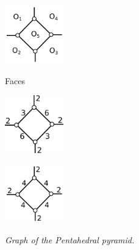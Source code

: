 \documentclass[suppldata, dvipdfmx]{interact}
\theoremstyle{plain}%
\theoremstyle{definition}
\theoremstyle{remark}
\theoremstyle{problemstyle}
\begin{document}
\begin{figure}[h!tbp]
  \begin{minipage}[t]{0.3\textwidth}
   \centering
   \includegraphics[width=1in, keepaspectratio]{./img/HexahedraWithSphericalFaces/pentahedralPyramid/pentahedralPyramidFaces.png}
   \caption{Faces}
   \label{fig:}
  \end{minipage}
 \hspace*{\fill}
  \begin{minipage}[t]{0.6\textwidth}
  \begin{minipage}[t]{0.3\textwidth}
   \centering
   \includegraphics[width=1in,
   keepaspectratio]{./img/HexahedraWithSphericalFaces/pentahedralPyramid/pentahedralPyramid_a.png}
   \subcaption{}
   \label{fig:}
  \end{minipage}
  \hspace*{\fill}
  \begin{minipage}[t]{0.3\textwidth}
   \centering
   \includegraphics[width=1in, keepaspectratio]{./img/HexahedraWithSphericalFaces/pentahedralPyramid/pentahedralPyramid_b.png}
   \subcaption{}
   \label{}
  \end{minipage}
 \hspace*{\fill}
  \caption{\textit{Graph of the Pentahedral pyramid.}}
  \label{fig:}
  \end{minipage}
\end{figure}
\end{document}
